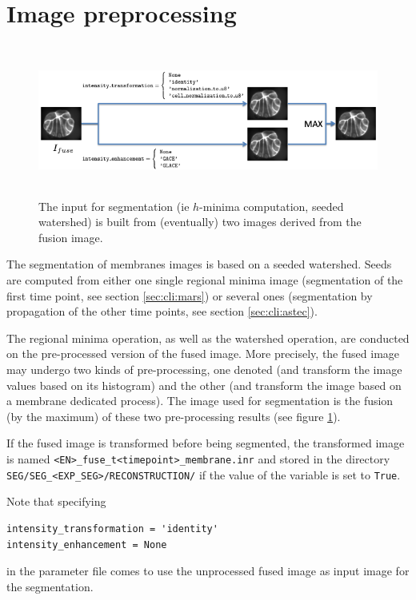 \section{Image preprocessing}
\label{sec:cli:input:image:preprocessing}


\begin{figure}
\begin{center}
\includegraphics[height=50mm]{figures/build-input-segmentation.png}
\end{center}
\caption{\label{fig:cli:input:image:preprocessing}
The input for segmentation (ie $h$-minima computation, seeded watershed) is built from (eventually) two images derived from the fusion image.}
\end{figure}


The segmentation of membranes images is based on a seeded watershed. Seeds are computed from either one single regional minima image (segmentation of the first time point, see section \ref{sec:cli:mars}) or several ones (segmentation by propagation of the other time points, see section \ref{sec:cli:astec}).


The regional minima operation, as well as the watershed operation, are conducted on the pre-processed version of the fused image. More precisely, the fused image may undergo two kinds of pre-processing, one denoted  (and transform the image values based on its histogram) and the other  (and transform the image based on a membrane dedicated process). The image used for segmentation is the fusion (by the maximum) of these two pre-processing results (see figure \ref{fig:cli:input:image:preprocessing}).

If the fused image is transformed before being segmented, the transformed image is named \texttt{<EN>\_fuse\_t<timepoint>\_membrane.inr} and stored in the directory \texttt{SEG/SEG\_<EXP\_SEG>/RECONSTRUCTION/} if the value of the variable  is set to \texttt{True}.

Note that specifying 
\begin{verbatim}
intensity_transformation = 'identity'
intensity_enhancement = None
\end{verbatim}
in the parameter file comes to use the unprocessed fused image as input image for the segmentation.


